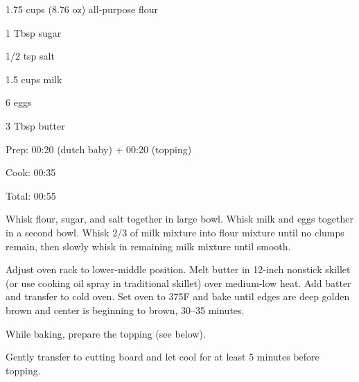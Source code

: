 \documentclass[oneside]{book}  %
\newcommand{\degF}{\textdegree F\xspace}
\begin{document}
\begin{IT}[0.727]
  \begin{ingredients}
    \item[1.75 cups (8.76 oz)] all-purpose flour
    \item[1 Tbsp] sugar
    \item[1/2 tsp] salt
    \item[1.5 cups] milk
    \item[6] eggs
    \item[3 Tbsp] butter
  \end{ingredients}

  \switchcolumn

  \begin{timeline}
    \item[Prep:]  00:20 (dutch baby) + 00:20 (topping)
    \item[Cook:]  00:35
    \item[Total:] 00:55
  \end{timeline}
\end{IT}

\begin{directions}
  \item Whisk flour, sugar, and salt together in large bowl. Whisk milk and eggs
  together in a second bowl. Whisk 2/3 of milk mixture into flour mixture until
  no clumps remain, then slowly whisk in remaining milk mixture until smooth.

  \item Adjust oven rack to lower-middle position. Melt butter in 12-inch
  nonstick skillet (or use cooking oil spray in traditional skillet) over
  medium-low heat. Add batter and transfer to cold oven. Set oven to 375\degF
  and bake until edges are deep golden brown and center is beginning to brown,
  30--35 minutes.

  \item While baking, prepare the topping (see below).

  \item Gently transfer to cutting board and let cool for at least 5 minutes
  before topping.
\end{directions}

\smallskip
\end{document}
